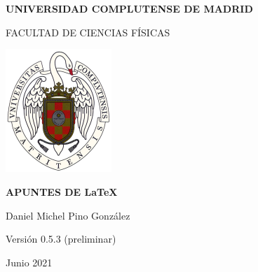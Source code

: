 \begin{titlepage}
\centering
{ \bfseries \Large UNIVERSIDAD COMPLUTENSE DE MADRID}
\vspace{0.5cm}

{\Large FACULTAD DE CIENCIAS FÍSICAS} 

\vspace{0.8cm}

{\includegraphics[width=0.3\textwidth]{logo_ucm}} %
\vspace{0.8cm}

{\bfseries \Large APUNTES DE \LaTeX}
\vspace{15mm}





{\Large Daniel Michel Pino González}\vspace{5mm} 


{\large Versión 0.5.3 (preliminar)}

{\large Junio 2021}\vspace{2cm} 

\doclicenseImage

\end{titlepage}